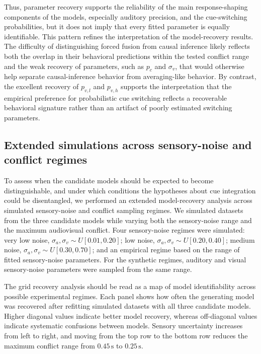 \documentclass{jov}
\begin{document}
Thus, parameter recovery supports the reliability of the main response-shaping components of the models, especially auditory precision, and the cue-switching probabilities, but it does not imply that every fitted parameter is equally identifiable. This pattern refines the interpretation of the model-recovery results. The difficulty of distinguishing forced fusion from causal inference likely reflects both the overlap in their behavioral predictions within the tested conflict range and the weak recovery of parameters, such as $p_c$ and $\sigma_v$, that would otherwise help separate causal-inference behavior from averaging-like behavior. By contrast, the excellent recovery of $p_{v,l}$ and $p_{v,h}$ supports the interpretation that the empirical preference for probabilistic cue switching reflects a recoverable behavioral signature rather than an artifact of poorly estimated switching parameters.



\subsection{Extended simulations across sensory-noise and conflict regimes}

To assess when the candidate models should be expected to become distinguishable, and under which conditions the hypotheses about cue integration could be disentangled, we performed an extended model-recovery analysis across simulated sensory-noise and conflict sampling regimes. We simulated datasets from the three candidate models while varying both the sensory-noise range and the maximum audiovisual conflict. Four sensory-noise regimes were simulated: very low noise, $\sigma_a,\sigma_v \sim U[0.01,0.20]$; low noise, $\sigma_a,\sigma_v \sim U[0.20,0.40]$; medium noise, $\sigma_a,\sigma_v \sim U[0.30,0.70]$; and an empirical regime based on the range of fitted sensory-noise parameters. For the synthetic regimes, auditory and visual sensory-noise parameters were sampled from the same range.

The grid recovery analysis should be read as a map of model identifiability across possible experimental regimes. Each panel shows how often the generating model was recovered after refitting simulated datasets with all three candidate models. Higher diagonal values indicate better model recovery, whereas off-diagonal values indicate systematic confusions between models. Sensory uncertainty increases from left to right, and moving from the top row to the bottom row reduces the maximum conflict range from $0.45\,\mathrm{s}$ to $0.25\,\mathrm{s}$.
\end{document}

